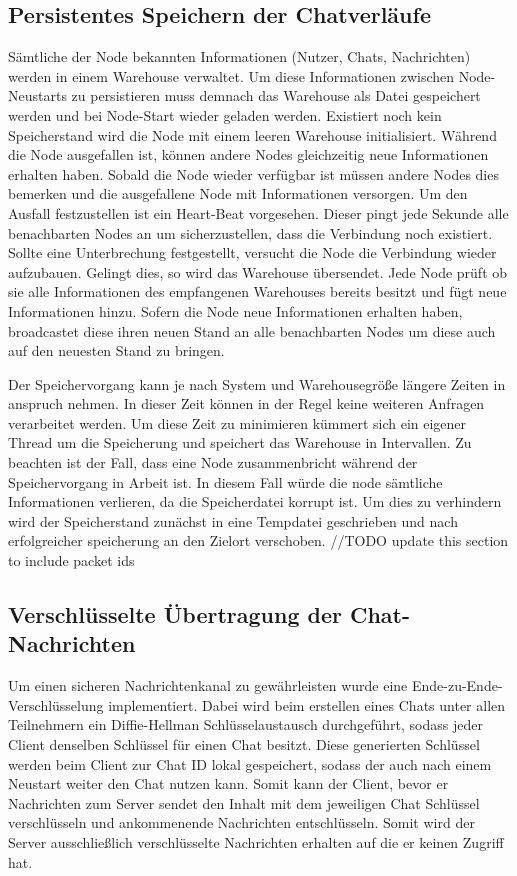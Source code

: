\author{Matthias Vonend}
\subsection{Persistentes Speichern der Chatverläufe}\label{persistance}
Sämtliche der Node bekannten Informationen (Nutzer, Chats, Nachrichten) werden in einem Warehouse verwaltet. Um diese Informationen zwischen Node-Neustarts zu persistieren muss demnach das Warehouse als Datei gespeichert werden und bei Node-Start wieder geladen werden. Existiert noch kein Speicherstand wird die Node mit einem leeren Warehouse initialisiert. Während die Node ausgefallen ist, können andere Nodes gleichzeitig neue Informationen erhalten haben. Sobald die Node wieder verfügbar ist müssen andere Nodes dies bemerken und die ausgefallene Node mit Informationen versorgen. Um den Ausfall festzustellen ist ein Heart-Beat vorgesehen. Dieser pingt jede Sekunde alle benachbarten Nodes an um sicherzustellen, dass die Verbindung noch existiert. Sollte eine Unterbrechung festgestellt, versucht die Node die Verbindung wieder aufzubauen. Gelingt dies, so wird das Warehouse übersendet. Jede Node prüft ob sie alle Informationen des empfangenen Warehouses bereits besitzt und fügt neue Informationen hinzu. Sofern die Node neue Informationen erhalten haben, broadcastet diese ihren neuen Stand an alle benachbarten Nodes um diese auch auf den neuesten Stand zu bringen.

Der Speichervorgang kann je nach System und Warehousegröße längere Zeiten in anspruch nehmen. In dieser Zeit können in der Regel keine weiteren Anfragen verarbeitet werden. Um diese Zeit zu minimieren kümmert sich ein eigener Thread um die Speicherung und speichert das Warehouse in Intervallen.
Zu beachten ist der Fall, dass eine Node zusammenbricht während der Speichervorgang in Arbeit ist. In diesem Fall würde die node sämtliche Informationen verlieren, da die Speicherdatei korrupt ist. Um dies zu verhindern wird der Speicherstand zunächst in eine Tempdatei geschrieben und nach erfolgreicher speicherung an den Zielort verschoben.
//TODO update this section to include packet ids

\author{Troy Keßler, Michael Angermeier}
\subsection{Verschlüsselte Übertragung der Chat-Nachrichten}\label{encryption}
Um einen sicheren Nachrichtenkanal zu gewährleisten wurde eine 
Ende-zu-Ende-Verschlüsselung implementiert. Dabei wird beim
erstellen eines Chats unter allen Teilnehmern ein Diffie-Hellman 
Schlüsselaustausch durchgeführt, sodass jeder Client denselben 
Schlüssel für einen Chat besitzt. Diese generierten Schlüssel 
werden beim Client zur Chat ID lokal gespeichert, sodass der
auch nach einem Neustart weiter den Chat nutzen kann. Somit kann 
der Client, bevor er Nachrichten zum Server sendet den Inhalt mit dem 
jeweiligen Chat Schlüssel verschlüsseln und ankommenende 
Nachrichten entschlüsseln. Somit wird der Server ausschließlich
verschlüsselte Nachrichten erhalten auf die er keinen Zugriff hat.

